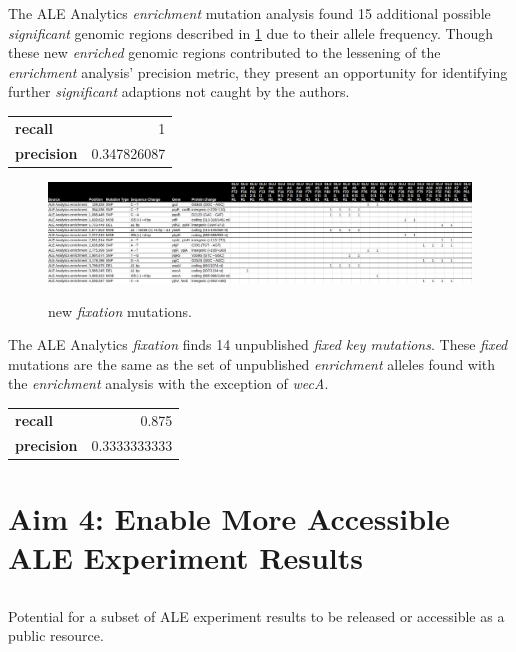 \documentclass[12pt,final,masters,chapterheads]{ucsd}  %
\begin{document}
The ALE Analytics \textit{enrichment} mutation analysis found 15 additional possible \textit{significant} genomic regions described in \ref{fig:GLU_new_enrich_muts} due to their allele frequency. Though these new \textit{enriched} genomic regions contributed to the lessening of the \textit{enrichment} analysis' precision metric, they present an opportunity for identifying further \textit{significant} adaptions not caught by the authors.

\begin{table}[h!]
\centering
\begin{tabular}{ l r }
  \textbf{recall} & 1 \\
  \textbf{precision} & 0.347826087 \\
\end{tabular}
\end{table}

\begin{figure}[h!]
  \caption{new \textit{fixation} mutations.}
  \centering
  \includegraphics[width=\textwidth]{GLU_new_enrich_muts.png}
  \label{fig:GLU_new_enrich_muts}
\end{figure}

The ALE Analytics \textit{fixation} finds 14 unpublished \textit{fixed key mutations}. These \textit{fixed} mutations are the same as the set of unpublished \textit{enrichment} alleles found with the \textit{enrichment} analysis with the exception of \textit{wecA}.

\begin{table}[h!]
\centering
\begin{tabular}{ l r }
  \textbf{recall} & 0.875 \\
  \textbf{precision} & 0.3333333333 \\
\end{tabular}
\end{table}

\chapter{Aim 4: Enable More Accessible ALE Experiment Results}
\section{}
Potential for a subset of ALE experiment results to be released or accessible as a public resource.
\end{document}
